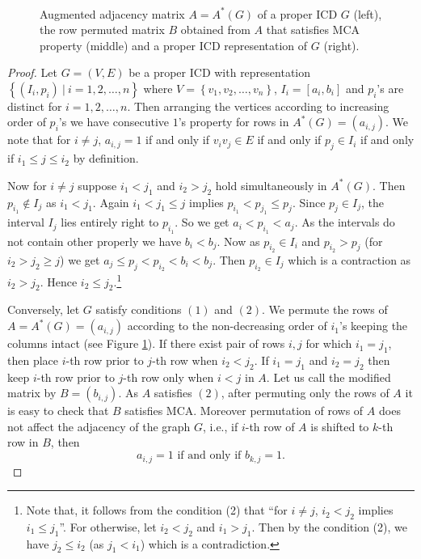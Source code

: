 \documentclass{article}
\theoremstyle{definition}
\numberwithin{equation}{section}
\newcommand{\set}[1]{\left\{#1\right\}}
\newcommand{\Set}[2]{\set{#1\ \vert\ #2}}
\begin{document}
\begin{figure}[t]
{\[\begin{array}{c|c|c|c|c|c|ccc}
\end{array}\]
\caption{Augmented adjacency matrix $A=A^*(G)$ of a proper ICD $G$ (left), the row permuted matrix $B$ obtained from $A$ that satisfies MCA property (middle) and a proper ICD representation of $G$ (right).}\label{pic1}
}
\end{figure}

\begin{proof}	
Let $G=(V,E)$ be a proper ICD with representation $\Set{(I_{i},p_{i})}{i=1,2,\ldots,n}$ where $V=\set{v_1,v_2,\ldots,v_n}$, $I_i=[a_i,b_i]$ and $p_i$'s are distinct for $i=1,2,\ldots,n$. Then arranging the vertices according to increasing order of $p_{i}$'s we have consecutive $1$'s property for rows in $A^{*}(G)=(a_{i,j})$. We note that for $i\neq j$, $a_{i,j}=1$ if and only if $v_iv_j\in E$ if and only if $p_j\in I_i$ if and only if $i_1\leq j\leq i_2$ by definition. 

\vspace{0.3em}\noindent
Now for $i\neq j$ suppose $i_{1}<j_{1}$ and $i_{2}>j_{2}$ hold simultaneously in $A^{*}(G)$. Then $p_{i_{1}}\notin I_{j}$ as $i_1<j_1$. Again $i_1<j_1\leq j$ implies $p_{i_1}<p_{j_1}\leq p_j$. Since $p_j\in I_j$, the interval $I_j$ lies entirely right to $p_{i_1}$. So we get $a_{i}<p_{i_{1}}<a_{j}$. As the intervals do not contain other properly we have $b_{i}<b_{j}$. Now as $p_{i_{2}}\in I_{i}$ and $p_{i_{2}}>p_{j}$ (for $i_2>j_2\geq j$) we get $a_{j}\leq p_{j}<p_{i_{2}}<b_{i}<b_{j}$. Then $p_{i_{2}}\in I_{j}$ which is a contraction as $i_2>j_2$. Hence $i_2\leq j_2$.\footnote{Note that, it follows from the condition (2) that ``for $i\neq j$, $i_2<j_2$ implies $i_1\leq j_1$''. For otherwise, let $i_2<j_2$ and $i_1>j_1$. Then by the condition (2), we have $j_2\leq i_2$ (as $j_1<i_1$) which is a contradiction.}
	
\vspace{0.5em}\noindent 
Conversely, let $G$ satisfy conditions $(1)$ and $(2)$. We permute the rows of $A=A^{*}(G)=(a_{i,j})$ according to the non-decreasing order of $i_{1}$'s keeping the columns intact (see Figure \ref{pic1}). If there exist pair of rows $i,j$ for which $i_{1}=j_{1}$, then place $i$-th row prior to $j$-th row when $i_{2}<j_{2}$. If $i_{1}=j_{1}$ and $i_{2}=j_{2}$ then keep $i$-th row prior to $j$-th row only when $i<j$ in $A$.
Let us call the modified matrix by $B=(b_{i,j})$. As $A$ satisfies $(2)$, after permuting only the rows of $A$ it is easy to check that $B$ satisfies MCA. Moreover permutation of rows of $A$ does not affect the adjacency of the graph $G$, i.e., if $i$-th row of $A$ is shifted to $k$-th row in $B$, then 
\begin{equation}\label{aij1}
a_{i,j}=1\text{ if and only if }b_{k,j}=1.
\end{equation} 


\end{proof}
\end{document}
